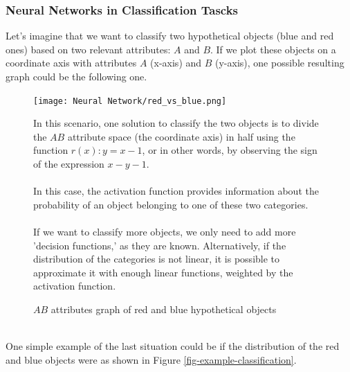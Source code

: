 \documentclass[a4paper, 11pt]{article}
\begin{document}
\subsubsection{Neural Networks in Classification Tascks}
Let's imagine that we want to classify two hypothetical objects (blue and red ones) based on two relevant attributes: $A$ and $B$. If we plot these objects on a coordinate axis with attributes $A$ (x-axis) and $B$ (y-axis), one possible resulting graph could be the following one.\newpage
\begin{figure}[h]
    \begin{minipage}{8cm}
       \begin{center}
           \texttt{[image: Neural Network/red\_vs\_blue.png]}
           \caption{$AB$ attributes graph of red and blue hypothetical objects}
       \end{center} 
    \end{minipage}
    \hspace{1em}
    \begin{minipage}{6cm}
        In this scenario, one solution to classify the two objects is to divide the $AB$ attribute space (the coordinate axis) in half using the function $r(x): y = x - 1$, or in other words, by observing the sign of the expression $x - y - 1$.\\\\
        In this case, the activation function provides information about the probability of an object belonging to one of these two categories.\\\\
        If we want to classify more objects, we only need to add more 'decision functions,' as they are known. Alternatively, if the distribution of the categories is not linear, it is possible to approximate it with enough linear functions, weighted by the activation function.
    \end{minipage}
\end{figure}\\
\hspace{-1.6em}One simple example of the last situation could be if the distribution of the red and blue objects were as shown in Figure \ref{fig-example-classification}.
\end{document}
